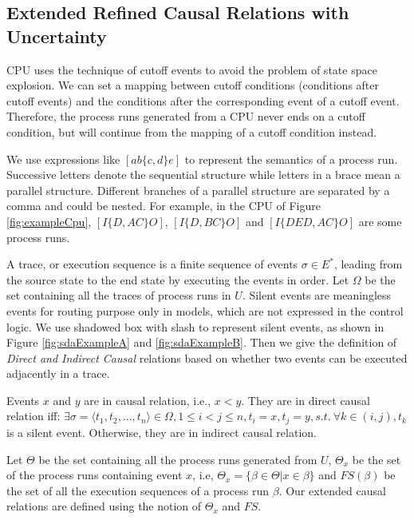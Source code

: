 \documentclass{llncs}
\begin{document}
\subsection{Extended Refined Causal Relations with Uncertainty}\label{subsec:causalAndInverseCausal}
CPU uses the technique of cutoff events to avoid the problem of state space explosion. We can set a mapping between cutoff conditions (conditions after cutoff events) and the conditions after the corresponding event of a cutoff event. Therefore, the process runs generated from a CPU never ends on a cutoff condition, but will continue from the mapping of a cutoff condition instead.

We use expressions like $[ab\{c,d\}e]$ to represent the semantics of a process run. Successive letters denote the sequential structure while letters in a brace mean a parallel structure. Different branches of a parallel structure are separated by a comma and could be nested. For example, in the CPU of Figure \ref{fig:exampleCpu}, $[I\{D,AC\}O]$, $[I\{D,BC\}O]$ and $[I\{DED,AC\}O]$ are some process runs.

A trace, or execution sequence is a finite sequence of events $\sigma\in E^{*}$, leading from the source state to the end state by executing the events in order. Let $\Omega$ be the set containing all the traces of process runs in $U$. Silent events are meaningless events for routing purpose only in models, which are not expressed in the control logic. We use shadowed box with slash to represent silent events, as shown in Figure \ref{fig:sdaExampleA} and \ref{fig:sdaExampleB}. Then we give the definition of \textit{Direct and Indirect Causal} relations based on whether two events can be executed adjacently in a trace.

\begin{definition}\label{def:sda}
Events $x$ and $y$ are in causal relation, i.e., $x<y$. They are in direct causal relation iff: $\exists\sigma=\langle t_{1},t_{2},...,t_{n}\rangle\in\Omega,1\leq i<j\leq n,t_{i}=x,t_{j}=y,s.t.~\forall k\in(i,j),t_{k}$ is a silent event. Otherwise, they are in indirect causal relation.
\end{definition}

Let $\Theta$ be the set containing all the process runs generated from $U$, $\Theta_{x}$ be the set of the process runs containing event $x$, i.e, $\Theta_{x}=\{\beta\in\Theta|x\in\beta\}$ and $FS(\beta)$ be the set of all the execution sequences of a process run $\beta$. Our extended causal relations are defined using the notion of $\Theta_{x}$ and $FS$.
\end{document}

